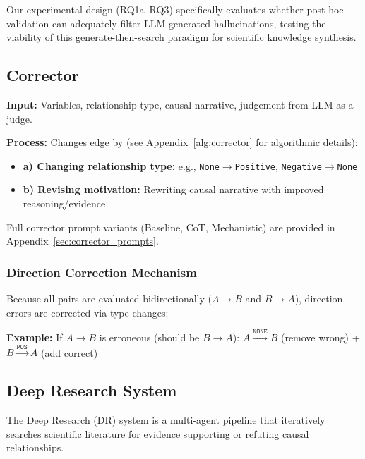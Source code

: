 Our experimental design (RQ1a--RQ3) specifically evaluates whether post-hoc validation can adequately filter LLM-generated hallucinations, testing the viability of this generate-then-search paradigm for scientific knowledge synthesis.

\subsection{Corrector}
\label{sec:corrector}

\textbf{Input:} Variables, relationship type, causal narrative, judgement from LLM-as-a-judge.

\textbf{Process:} Changes edge by (see Appendix~\ref{alg:corrector} for algorithmic details):
\begin{itemize}[noitemsep]
    \item \textbf{a) Changing relationship type:} e.g., \texttt{None}$\rightarrow$\texttt{Positive}, \texttt{Negative}$\rightarrow$\texttt{None}
    \item \textbf{b) Revising motivation:} Rewriting causal narrative with improved reasoning/evidence
\end{itemize}
Full corrector prompt variants (Baseline, CoT, Mechanistic) are provided in Appendix~\ref{sec:corrector_prompts}.

\subsubsection{Direction Correction Mechanism}
Because all pairs are evaluated bidirectionally ($A \rightarrow B$ and $B \rightarrow A$), direction errors are corrected via type changes:

\textbf{Example:} If $A \rightarrow B$ is erroneous (should be $B \rightarrow A$):
$A \xrightarrow{\texttt{NONE}} B$ (remove wrong) + $B \xrightarrow{\texttt{POS}} A$ (add correct)

\subsection{Deep Research System}
\label{sec:deep_research_system}

The Deep Research (DR) system is a multi-agent pipeline that iteratively searches scientific literature for evidence supporting or refuting causal relationships.

